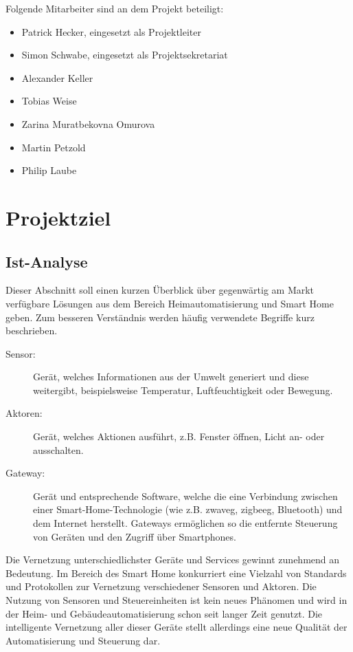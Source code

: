 \documentclass[12pt, oneside, smallheadings]{scrbook}
\begin{document}
\newpage
\noindent
Folgende Mitarbeiter sind an dem Projekt beteiligt:\\
\begin{itemize}
	\item Patrick Hecker, eingesetzt als Projektleiter
	\item Simon Schwabe, eingesetzt als Projektsekretariat
	\item Alexander Keller
	\item Tobias Weise
	\item Zarina Muratbekovna Omurova
	\item Martin Petzold
	\item Philip Laube
\end{itemize}

\chapter{Projektziel}
\section{Ist-Analyse}
Dieser Abschnitt soll einen kurzen Überblick über gegenwärtig am Markt verfügbare Lösungen aus dem Bereich Heimautomatisierung und Smart Home geben. Zum besseren Verständnis werden häufig verwendete Begriffe kurz beschrieben.

\begin{description}
	\item[Sensor:] Gerät, welches Informationen aus der Umwelt generiert und diese weitergibt, beispielsweise Temperatur, Luftfeuchtigkeit oder Bewegung.
	\item[Aktoren:] Gerät, welches Aktionen ausführt, z.B. Fenster öffnen, Licht an- oder ausschalten.
	\item[Gateway:] Gerät und entsprechende Software, welche die eine Verbindung zwischen einer Smart-Home-Technologie (wie z.B. \gls{zwaveg}, \gls{zigbeeg}, Bluetooth) und dem Internet herstellt. Gateways ermöglichen so die entfernte Steuerung von Geräten und den Zugriff über Smartphones.
\end{description}

Die Vernetzung unterschiedlichster Geräte und Services gewinnt zunehmend an Bedeutung. Im Bereich des Smart Home konkurriert eine Vielzahl von Standards und Protokollen zur Vernetzung verschiedener Sensoren und Aktoren. Die Nutzung von Sensoren und Steuereinheiten ist kein neues Phänomen und wird in der Heim- und Gebäudeautomatisierung schon seit langer Zeit genutzt. Die intelligente Vernetzung aller dieser Geräte stellt allerdings eine neue Qualität der Automatisierung und Steuerung dar.
\end{document}
